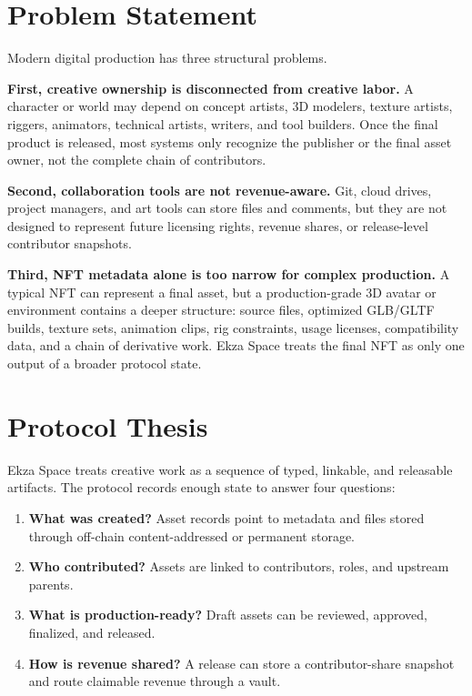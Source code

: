 \documentclass[10pt,twocolumn]{article}
\begin{document}
\section{Problem Statement}
Modern digital production has three structural problems.

\textbf{First, creative ownership is disconnected from creative labor.} A character or world may depend on concept artists, 3D modelers, texture artists, riggers, animators, technical artists, writers, and tool builders. Once the final product is released, most systems only recognize the publisher or the final asset owner, not the complete chain of contributors.

\textbf{Second, collaboration tools are not revenue-aware.} Git, cloud drives, project managers, and art tools can store files and comments, but they are not designed to represent future licensing rights, revenue shares, or release-level contributor snapshots.

\textbf{Third, NFT metadata alone is too narrow for complex production.} A typical NFT can represent a final asset, but a production-grade 3D avatar or environment contains a deeper structure: source files, optimized GLB/GLTF builds, texture sets, animation clips, rig constraints, usage licenses, compatibility data, and a chain of derivative work. Ekza Space treats the final NFT as only one output of a broader protocol state.

\section{Protocol Thesis}
Ekza Space treats creative work as a sequence of typed, linkable, and releasable artifacts. The protocol records enough state to answer four questions:

\begin{enumerate}
    \item \textbf{What was created?} Asset records point to metadata and files stored through off-chain content-addressed or permanent storage.
    \item \textbf{Who contributed?} Assets are linked to contributors, roles, and upstream parents.
    \item \textbf{What is production-ready?} Draft assets can be reviewed, approved, finalized, and released.
    \item \textbf{How is revenue shared?} A release can store a contributor-share snapshot and route claimable revenue through a vault.
\end{enumerate}
\end{document}
